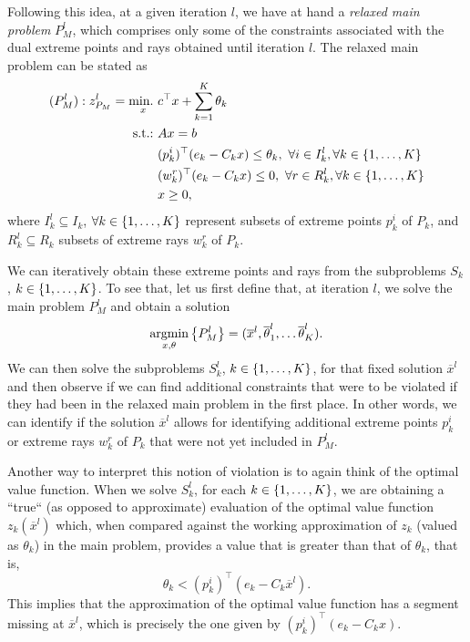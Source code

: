 Following this idea, at a given iteration $l$, we have at hand a \emph{relaxed main problem} $P_M^l$, which comprises only some of the constraints associated with the dual extreme points and rays obtained until iteration $l$. The relaxed main problem can be stated as
%
\begin{align*}
	(P^l_M) : z_{P_M}^l = \mathop{\text{min.~}}_x & c^\top x + \sum_{k=1}^K\theta_k \\
	\mathop{\text{s.t.:~}}   & Ax = b \nonumber \\
		  & (p^i_k)^\top (e_k - C_k x) \leq  \theta_k, \ \forall i \in I_k^l, \forall k \in \left\{ 1, \dots, K \right \}  \\
		  & (w^r_k)^\top (e_k - C_k x) \leq 0, \ \forall r \in R_k^l, \forall k \in \left\{ 1, \dots, K \right \}  \\
	      & x \geq 0, 
\end{align*}
%
where $I_k^l \subseteq I_k$, $\forall k \in \left\{ 1,\dots,K \right \}$ represent subsets of extreme points $p^i_k$ of $P_k$, and $R^l_k \subseteq R_k$ subsets of extreme rays $w^r_k$ of $P_k$.

We can iteratively obtain these extreme points and rays from the subproblems $S_k$, $k \in \left\{ 1, \dots, K \right \}$. To see that, let us first define that, at iteration $l$, we solve the main problem $P_M^l$ and obtain a solution
%
\begin{equation*}
	\mathop{\rm argmin}_{x, \theta} \left\{ P_M^l \right \} = (\overline{x}^l, \overline{\theta}^l_1, \dots \overline{\theta}^l_K). 
\end{equation*}
%
We can then solve the subproblems $S_k^l$, $k \in \left\{ 1, \dots, K \right \}$, for that fixed solution $\overline{x}^l$ and then observe if we can find additional constraints that were to be violated if they had been in the relaxed main problem in the first place. In other words, we can identify if the solution $\overline{x}^l$ allows for identifying additional extreme points $p^i_k$ or extreme rays $w^r_k$ of $P_k$ that were not yet included in $P_M^l$. 

Another way to interpret this notion of violation is to again think of the optimal value function. When we solve $S_k^l$, for each $k \in \left\{ 1, \dots, K \right \}$, we are obtaining a ``true`` (as opposed to approximate) evaluation of the optimal value function $z_k(\overline{x}^l)$ which, when compared against the working approximation of $z_k$ (valued as $\theta_k$) in the main problem, provides a value that is greater than that of $\theta_k$, that is,
%
\begin{equation}
	\theta_k < (p^i_k)^\top (e_k - C_k \overline{x}^l).
\end{equation}
%
This implies that the approximation of the optimal value function has a segment missing at $\overline{x}^l$, which is precisely the one given by $(p^i_k)^\top (e_k - C_k x)$. 

